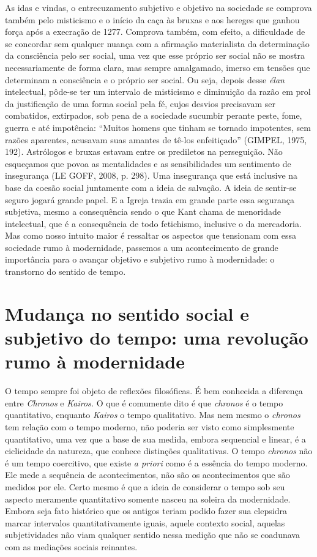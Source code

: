 As idas e vindas, o entrecuzamento subjetivo e objetivo na sociedade se
comprova também pelo misticismo e o início da caça às bruxas e aos
hereges que ganhou força após a execração de 1277. Comprova também, com
efeito, a dificuldade de se concordar sem qualquer nuança com a
afirmação materialista da determinação da consciência pelo ser social,
uma vez que esse próprio ser social não se mostra necessariamente de
forma clara, mas sempre amalgamado, imerso em tensões que determinam a
consciência e o próprio ser social. Ou seja, depois desse \emph{élan}
intelectual, pôde-se ter um intervalo de misticismo e diminuição da
razão em prol da justificação de uma forma social pela fé, cujos desvios
precisavam ser combatidos, extirpados, sob pena de a sociedade sucumbir
perante peste, fome, guerra e até impotência: ``Muitos homens que tinham
se tornado impotentes, sem razões aparentes, acusavam suas amantes de
tê-los enfeitiçado'' (GIMPEL, 1975, 192). Astrólogos e bruxas estavam
entre os prediletos na perseguição. Não esqueçamos que povoa as
mentalidades e as sensibilidades um sentimento de insegurança (LE GOFF,
2008, p. 298). Uma insegurança que está inclusive na base da coesão
social juntamente com a ideia de salvação. A ideia de sentir-se seguro
jogará grande papel. E a Igreja trazia em grande parte essa segurança
subjetiva, mesmo a consequência sendo o que Kant chama de menoridade
intelectual, que é a consequência de todo fetichismo, inclusive o da
mercadoria. Mas como nosso intuito maior é ressaltar os aspectos que
tensionam com essa sociedade rumo à modernidade, passemos a um
acontecimento de grande importância para o avançar objetivo e subjetivo
rumo à modernidade: o transtorno do sentido de tempo.

\section{Mudança no sentido social e subjetivo do tempo: uma revolução rumo à modernidade}

O tempo sempre foi objeto de reflexões filosóficas. É bem conhecida a
diferença entre \emph{Chronos} e \emph{Kairos.} O que é comumente dito é
que \emph{chronos} é o tempo quantitativo, enquanto \emph{Kairos} o
tempo qualitativo. Mas nem mesmo o \emph{chronos} tem relação com o
tempo moderno, não poderia ser visto como simplesmente quantitativo, uma
vez que a base de sua medida, embora sequencial e linear, é a
ciclicidade da natureza, que conhece distinções qualitativas. O tempo
\emph{chronos} não é um tempo coercitivo, que existe \emph{a priori}
como é a essência do tempo moderno. Ele mede a sequência de
acontecimentos, não são os acontecimentos que são medidos por ele. Certo
mesmo é que a ideia de considerar o tempo sob seu aspecto meramente
quantitativo somente nasceu na soleira da modernidade. Embora seja fato
histórico que os antigos teriam podido fazer sua clepsidra marcar
intervalos quantitativamente iguais, aquele contexto social, aquelas
subjetividades não viam qualquer sentido nessa medição que não se
coadunava com as mediações sociais reinantes.

